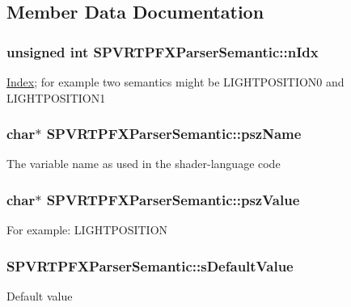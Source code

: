 \subsection{Member Data Documentation}
\hypertarget{struct_s_p_v_r_t_p_f_x_parser_semantic_a85a4c86faaa079189b73b62f20734ea4}{
\subsubsection[{n\+Idx}]{\setlength{\rightskip}{0pt plus 5cm}unsigned int S\+P\+V\+R\+T\+P\+F\+X\+Parser\+Semantic\+::n\+Idx}}\label{struct_s_p_v_r_t_p_f_x_parser_semantic_a85a4c86faaa079189b73b62f20734ea4}
\hyperlink{struct_index}{Index}; for example two semantics might be L\+I\+G\+H\+T\+P\+O\+S\+I\+T\+I\+O\+N0 and L\+I\+G\+H\+T\+P\+O\+S\+I\+T\+I\+O\+N1 \hypertarget{struct_s_p_v_r_t_p_f_x_parser_semantic_a6a40e2a0953155755004a27a91592b25}{
\subsubsection[{psz\+Name}]{\setlength{\rightskip}{0pt plus 5cm}char$\ast$ S\+P\+V\+R\+T\+P\+F\+X\+Parser\+Semantic\+::psz\+Name}}\label{struct_s_p_v_r_t_p_f_x_parser_semantic_a6a40e2a0953155755004a27a91592b25}
The variable name as used in the shader-\/language code \hypertarget{struct_s_p_v_r_t_p_f_x_parser_semantic_a23ebe347d03719281c7a6f5d60094a13}{
\subsubsection[{psz\+Value}]{\setlength{\rightskip}{0pt plus 5cm}char$\ast$ S\+P\+V\+R\+T\+P\+F\+X\+Parser\+Semantic\+::psz\+Value}}\label{struct_s_p_v_r_t_p_f_x_parser_semantic_a23ebe347d03719281c7a6f5d60094a13}
For example\+: L\+I\+G\+H\+T\+P\+O\+S\+I\+T\+I\+O\+N \hypertarget{struct_s_p_v_r_t_p_f_x_parser_semantic_a5858894032691240acd1eb52609c6e68}{
\subsubsection[{s\+Default\+Value}]{ S\+P\+V\+R\+T\+P\+F\+X\+Parser\+Semantic\+::s\+Default\+Value}}\label{struct_s_p_v_r_t_p_f_x_parser_semantic_a5858894032691240acd1eb52609c6e68}
Default value 

